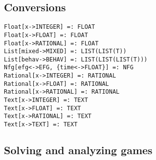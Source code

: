 \subsection{Conversions}

\begin{verbatim}
Float[x->INTEGER] =: FLOAT
Float[x->FLOAT] =: FLOAT
Float[x->RATIONAL] =: FLOAT
List[mixed->MIXED] =: LIST(LIST(T))
List[behav->BEHAV] =: LIST(LIST(LIST(T)))
Nfg[efg<->EFG, {time<->FLOAT}] =: NFG
Rational[x->INTEGER] =: RATIONAL
Rational[x->FLOAT] =: RATIONAL
Rational[x->RATIONAL] =: RATIONAL
Text[x->INTEGER] =: TEXT
Text[x->FLOAT] =: TEXT
Text[x->RATIONAL] =: TEXT
Text[x->TEXT] =: TEXT
\end{verbatim}

\subsection{Solving and analyzing games}

